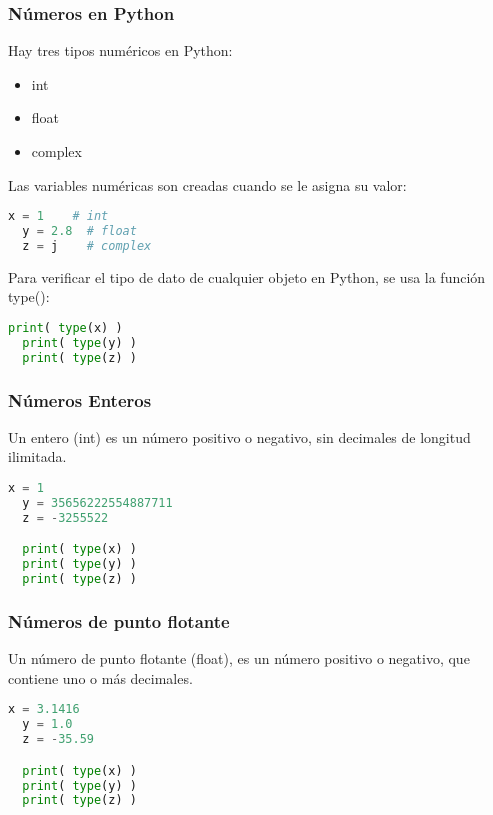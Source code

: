 \begin{frame}[fragile]
  \frametitle{Números en Python}

  Hay tres tipos numéricos en Python:

  \begin{itemize}
    \item \textcolor{codeKeyword}{int}
    \item \textcolor{codeKeyword}{float}
    \item \textcolor{codeKeyword}{complex}
  \end{itemize}

  Las variables numéricas son creadas cuando se le asigna su valor:

  \begin{lstlisting}[language=Python]
  x = 1    # int
  y = 2.8  # float
  z = j    # complex
  \end{lstlisting}

  \pausa
  Para verificar el tipo de dato de cualquier objeto en Python, se usa la
  función \textcolor{codeKeyword}{type}():

  \begin{lstlisting}[language=Python]
  print( type(x) )
  print( type(y) )
  print( type(z) )
  \end{lstlisting}
\end{frame}

\begin{frame}[fragile]
  \frametitle{Números Enteros}

  Un entero (\textcolor{codeKeyword}{int}) es un número positivo o
  negativo, sin decimales de longitud ilimitada.

  \begin{lstlisting}[language=Python]
  x = 1
  y = 35656222554887711
  z = -3255522

  print( type(x) )
  print( type(y) )
  print( type(z) )
  \end{lstlisting}
\end{frame}

\begin{frame}[fragile]
  \frametitle{Números de punto flotante}

  Un número de punto flotante (\textcolor{codeKeyword}{float}), es un número
  positivo o negativo, que contiene uno o más decimales.

  \begin{lstlisting}[language=Python]
  x = 3.1416
  y = 1.0
  z = -35.59

  print( type(x) )
  print( type(y) )
  print( type(z) )
  \end{lstlisting}
\end{frame}

